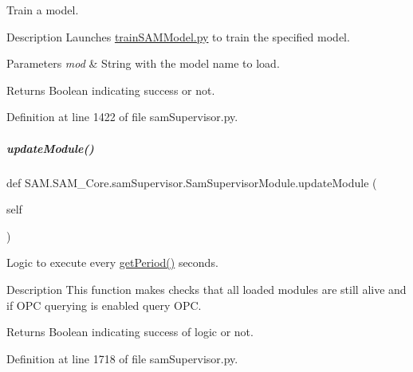Train a model. 

\begin{DoxyParagraph}{Description}
Launches \hyperlink{trainSAMModel_8py}{train\+S\+A\+M\+Model.\+py} to train the specified model.
\end{DoxyParagraph}

\begin{DoxyParams}{Parameters}
{\em mod} & String with the model name to load.\\
\hline
\end{DoxyParams}
\begin{DoxyParagraph}{Returns}
Boolean indicating success or not. 
\end{DoxyParagraph}


Definition at line 1422 of file sam\+Supervisor.\+py.

\mbox{\label{group__icubclient__SAM__Core_a7a8e2239caf5d90438716dd1c7f65055}} 
\subparagraph{\texorpdfstring{update\+Module()}{updateModule()}}
{\footnotesize\ttfamily def S\+A\+M.\+S\+A\+M\+\_\+\+Core.\+sam\+Supervisor.\+Sam\+Supervisor\+Module.\+update\+Module (\begin{DoxyParamCaption}\item[{}]{self }\end{DoxyParamCaption})}



Logic to execute every \hyperlink{group__icubclient__SAM__Core_a359693de09f891957293074941a5a254}{get\+Period()} seconds. 

\begin{DoxyParagraph}{Description}
This function makes checks that all loaded modules are still alive and if O\+PC querying is enabled query O\+PC.
\end{DoxyParagraph}
Returns Boolean indicating success of logic or not. 

Definition at line 1718 of file sam\+Supervisor.\+py.



